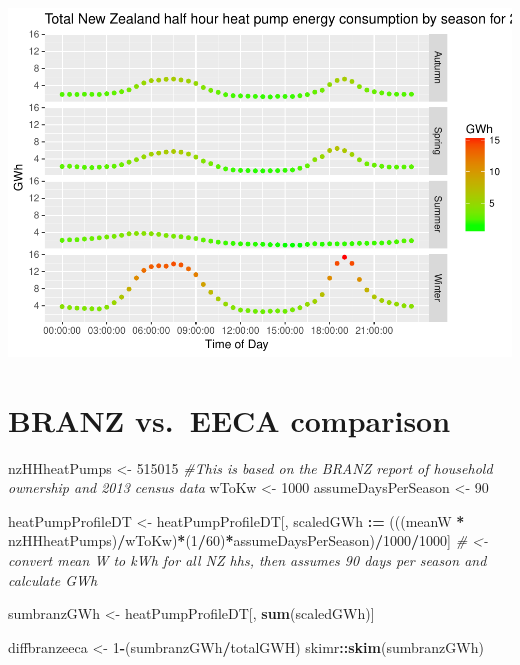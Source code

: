 \documentclass[]{article}
\newenvironment{Shaded}{\begin{snugshade}}{\end{snugshade}}
\newcommand{\KeywordTok}[1]{\textcolor[rgb]{0.13,0.29,0.53}{\textbf{#1}}}
\newcommand{\DecValTok}[1]{\textcolor[rgb]{0.00,0.00,0.81}{#1}}
\newcommand{\StringTok}[1]{\textcolor[rgb]{0.31,0.60,0.02}{#1}}
\newcommand{\CommentTok}[1]{\textcolor[rgb]{0.56,0.35,0.01}{\textit{#1}}}
\newcommand{\OperatorTok}[1]{\textcolor[rgb]{0.81,0.36,0.00}{\textbf{#1}}}
\newcommand{\ErrorTok}[1]{\textcolor[rgb]{0.64,0.00,0.00}{\textbf{#1}}}
\newcommand{\NormalTok}[1]{#1}
\theoremstyle{definition}
\theoremstyle{definition}
\theoremstyle{definition}
\theoremstyle{remark}
\begin{document}
\includegraphics{heatPumpProfileAnalysis_files/figure-latex/aggregateMethod2-1.pdf}

\section{BRANZ vs.~EECA comparison}\label{branz-vs.eeca-comparison}

\begin{Shaded}
\begin{Highlighting}[]
\NormalTok{nzHHheatPumps <-}\StringTok{ }\DecValTok{515015} \CommentTok{#This is based on the BRANZ report of household ownership and 2013 census data}
\NormalTok{wToKw <-}\StringTok{ }\DecValTok{1000}
\NormalTok{assumeDaysPerSeason <-}\StringTok{ }\DecValTok{90}

\NormalTok{heatPumpProfileDT <-}\StringTok{ }\NormalTok{heatPumpProfileDT[, scaledGWh }\OperatorTok{:}\ErrorTok{=}\StringTok{ }\NormalTok{(((meanW }\OperatorTok{*}\StringTok{ }\NormalTok{nzHHheatPumps)}\OperatorTok{/}\NormalTok{wToKw)}\OperatorTok{*}\NormalTok{(}\DecValTok{1}\OperatorTok{/}\DecValTok{60}\NormalTok{)}\OperatorTok{*}\NormalTok{assumeDaysPerSeason)}\OperatorTok{/}\DecValTok{1000}\OperatorTok{/}\DecValTok{1000}\NormalTok{] }\CommentTok{# <- convert mean W to kWh for all NZ hhs, then assumes 90 days per season and calculate GWh}

\NormalTok{sumbranzGWh <-}\StringTok{ }\NormalTok{heatPumpProfileDT[, }\KeywordTok{sum}\NormalTok{(scaledGWh)]}


\NormalTok{diffbranzeeca <-}\StringTok{ }\DecValTok{1}\OperatorTok{-}\NormalTok{(sumbranzGWh}\OperatorTok{/}\NormalTok{totalGWH)}
\NormalTok{skimr}\OperatorTok{::}\KeywordTok{skim}\NormalTok{(sumbranzGWh)}
\end{Highlighting}
\end{Shaded}
\end{document}
